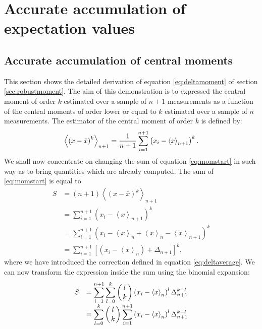 \documentclass[twoside]{book}
\begin{document}
\fi

\chapter{Accurate accumulation of expectation values}
\section{Accurate accumulation of central moments}
\label{sec:centralmoments} This section shows the detailed
derivation of equation \ref{eq:deltamoment} of section
\ref{sec:robustmoment}. The aim of this demonstration is to
expressed the central moment of order $k$ estimated over a sample
of $n+1$ measurements as a function of the central moments of
order lower or equal to $k$ estimated over a sample of $n$
measurements. The estimator of the central moment of order $k$ is
defined by:
\begin{equation}
\label{eq:momstart}
 \left\langle\left(x-\bar{x}\right)^k\right\rangle_{n+1}
   =\displaystyle{1\over n+1}\sum_{i=1}^{n+1} \left(x_i-\left\langle
   x\right\rangle_{n+1}\right)^k.
\end{equation}
We shall now concentrate on changing the sum of equation
\ref{eq:momstart} in such way as to bring quantities which are
already computed. The sum of \ref{eq:momstart} is equal to
\begin{equation}
  \begin{array}{ll}
 S&=\left(n+1\right)\left\langle\left(x-\bar{x}\right)^k\right\rangle_{n+1}\\
   &=\displaystyle\sum_{i=1}^{n+1} \left(x_i-\left\langle x\right\rangle_{n+1}\right)^k\\
   &=\displaystyle\sum_{i=1}^{n+1} \left(x_i-\left\langle x\right\rangle_n+
   \left\langle x\right\rangle_n-\left\langle
   x\right\rangle_{n+1}\right)^k\\
   &=\displaystyle\sum_{i=1}^{n+1} \left[\left(x_i-\left\langle x\right\rangle_n\right)
   +\Delta_{n+1}\right]^k,
  \end{array}
\end{equation}
where we have introduced the correction defined in equation
\ref{eq:deltaverage}. We can now transform the expression inside
the sum using the binomial expansion:
\begin{equation}
\label{eq:deltamomentsstep}
  \begin{array}{ll}
 S&=\displaystyle\sum_{i=1}^{n+1} \sum_{l=0}^k \left({l\atop
   k}\right)
   \left(x_i-\left\langle x\right\rangle_n\right)^l
   \Delta_{n+1}^{k-l}\\
   &=\displaystyle\sum_{l=0}^k \left({l\atop
   k}\right)\sum_{i=1}^{n+1}
   \left(x_i-\left\langle x\right\rangle_n\right)^l
   \Delta_{n+1}^{k-l}\\
  \end{array}
\end{equation}
\end{document}
